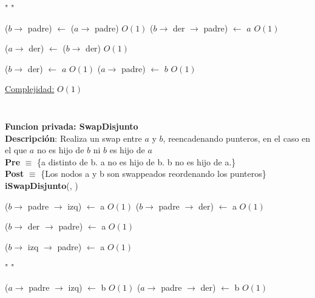 \begin{Algoritmos}
\begin{algorithm}[H]
\begin{algorithmic}[1]
    \State " "

    \State ($b \to$ padre) $\gets$ ($a \to$ padre) \Comment $O(1)$
        \State ($b \to$ der $\to$ padre) $\gets$ $a$ \Comment $O(1)$
    \EndIf
    
    \State ($a \to$ der) $\gets$ ($b \to$ der) \Comment $O(1)$
    
    \State ($b \to$ der) $\gets$ $a$ \Comment $O(1)$
    \State ($a \to$ padre) $\gets$ $b$ \Comment $O(1)$

    \medskip
    \Statex \underline{Complejidad:} $O(1)$

\end{algorithmic}
\end{algorithm}

$ $\newline


$ $\newline

\begin{algorithm}[H]
\textbf{Funcion privada: SwapDisjunto}\\
\textbf{Descripci\'on}: Realiza un swap entre $a$ y $b$, reencadenando punteros, en el caso en el que $a$ no es hijo de $b$ ni $b$ es hijo de $a$\\
\textbf{Pre} $\equiv$ \{a distinto de b. a no es hijo de b. b no es hijo de a.\}\\
\textbf{Post} $\equiv$ \{Los nodos a y b son swappeados reordenando los punteros\}\\
{\textbf{iSwapDisjunto}(, )}
\begin{algorithmic}[1]

        \State ($b \to$ padre $\to$ izq) $\gets$ a \Comment $O(1)$
    \Else {}
        \State ($b \to$ padre $\to$ der) $\gets$ a \Comment $O(1)$
    \EndIf
    \EndIf

        \State ($b \to$ der $\to$ padre) $\gets$ a \Comment $O(1)$
    \EndIf

        \State ($b \to$ izq $\to$ padre) $\gets$ a \Comment $O(1)$
    \EndIf

    \State " "

        \State ($a \to$ padre $\to$ izq) $\gets$ b \Comment $O(1)$
    \Else {}
        \State ($a \to$ padre $\to$ der) $\gets$ b \Comment $O(1)$
    \EndIf
    \EndIf


\end{algorithmic}
\end{algorithm}
\end{Algoritmos}
